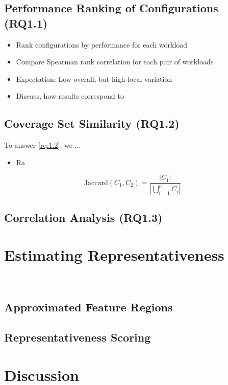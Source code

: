 \subsection{Performance Ranking of Configurations (RQ1.1)}
{\color{teal}
\begin{itemize}
	\item Rank configurations by performance for each workload
	\item Compare Spearman rank correlation for each pair of workloads
	\item Expectation: Low overall, but high local variation
	\item Discuss, how results correspond to~\cite{jamishidi_transfer_2017}
\end{itemize}
}

\subsection{Coverage Set Similarity (RQ1.2)}
To answer \ref{rq:1.2}, we ... 
{\color{teal}
	\begin{itemize}
		\item Ra
	\end{itemize}
}

\begin{equation}
	\text{Jaccard}(C_1, C_2) = \frac{|C_1|}{|\bigcup_{i=1}^{n} C_i|}
\end{equation}

\subsection{Correlation Analysis (RQ1.3)}

\clearpage
\section{Estimating Representativeness}~\label{sec:metric}

\subsection{Approximated Feature Regions}

\subsection{Representativeness Scoring}

\section{Discussion}

